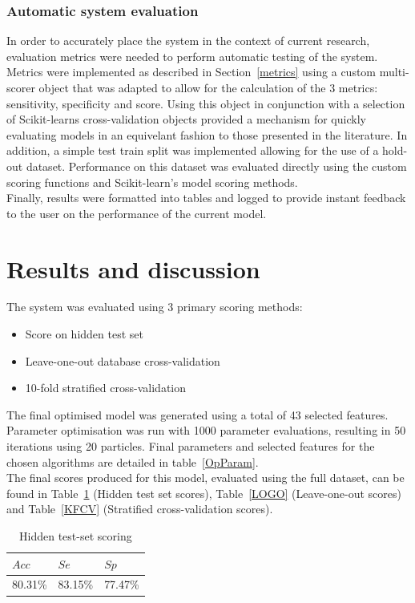 \documentclass[titlepage, 12pt]{scrartcl} \usepackage{enumitem}
\begin{document}
\subsubsection{Automatic system evaluation}
In order to accurately place the system in the context of current research,
evaluation metrics were needed to perform automatic testing of the system.
Metrics were implemented as described in Section~\ref{metrics} using a custom
multi-scorer object that was adapted to allow for the calculation of the 3
metrics: sensitivity, specificity and score. Using this object in conjunction
with a selection of Scikit-learns cross-validation objects provided a mechanism
for quickly evaluating models in an equivelant fashion to those presented in
the literature. In addition, a simple test train split was implemented allowing
for the use of a hold-out dataset. Performance on this dataset was evaluated
directly using the custom scoring functions and Scikit-learn's model scoring
methods.\\
Finally, results were formatted into tables and logged to provide instant
feedback to the user on the performance of the current model.

\section{Results and discussion}\label{Eval}
The system was evaluated using 3 primary scoring methods:
\begin{itemize}
    \item Score on hidden test set
    \item Leave-one-out database cross-validation
    \item 10-fold stratified cross-validation
\end{itemize}

The final optimised model was generated using a total of 43 selected features. Parameter optimisation was run with 1000 parameter
evaluations, resulting in 50 iterations using 20 particles. Final parameters
and selected features 
for the chosen algorithms are detailed in table~\ref{OpParam}.\\
The final scores produced for this model, evaluated using the full dataset, can
be found in Table~\ref{TestSet} (Hidden test set scores), Table~\ref{LOGO}
(Leave-one-out scores) and
Table~\ref{KFCV} (Stratified cross-validation scores).

\begin{table}[H]
\centering
\caption{Hidden test-set scoring}
\label{TestSet}
\begin{tabular}{@{}lll@{}}
\toprule
$Acc$  & $Se$    & $Sp$    \\ \midrule
80.31\% & 83.15\% & 77.47\% \\ \bottomrule
\end{tabular}
\end{table}
\end{document}
